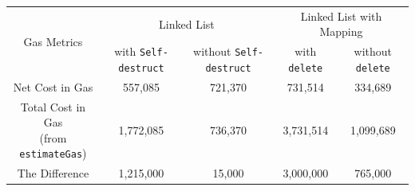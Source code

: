 \begin{table}[]
\begin{tabular}{|c|c|c|c|c|}
\hline
\multirow{2}{*}{Gas Metrics}                        							& \multicolumn{2}{c|}{Linked List}           						& \multicolumn{2}{c|}{Linked List with Mapping}     					\\ \cline{2-5} 
                                                                						& with \texttt{Self-destruct} 		& without \texttt{Self-destruct}                	& with \texttt{delete} 		& without \texttt{delete}              		\\ \hline                                                                                                                                                                                                                                                          %
                   Net Cost in Gas                          					& 557,085                    			& 721,370                     				& 731,514                     	& 334,689                      				\\ \hline
\thead{Total Cost in Gas \\ (from \texttt{estimateGas})} 		& 1,772,085                  			& 736,370                  					& 3,731,514                     	& 1,099,689                       				\\ \hline
		    The Difference                                             		& 1,215,000                  			& 15,000                      				& 3,000,000                    	& 765,000                       				\\ \hline

\end{tabular}
\end{table}












